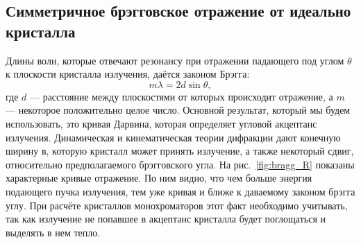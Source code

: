 \documentclass[14pt,a4paper]{extarticle}
\numberwithin{equation}{section}
\begin{document}
\subsection{Симметричное брэгговское отражение от идеально кристалла}
Длины волн, которые отвечают резонансу при отражении падающего под углом $\theta$ к плоскости кристалла излучения, даётся законом Брэгга:  
\begin{equation}
	m\lambda = 2d\sin\theta,
\end{equation}
где $d$ --- расстояние между плоскостями от которых происходит отражение, а $m$ --- некоторое положительно целое число. Основной результат, который мы будем использовать, это кривая Дарвина, которая определяет угловой акцептанс излучения. Динамическая и кинематическая теории дифракции дают конечную ширину в, которую кристалл может принять излучение, а также некоторый сдвиг, относительно предполагаемого брэгговского угла. На рис.~\ref{fig:bragg_R} показаны характерные кривые отражение. По ним видно, что чем больше энергия подающего пучка излучения, тем уже кривая и ближе к даваемому законом брэгга углу. При расчёте кристаллов монохроматоров этот факт необходимо учитывать, так как излучение не попавшее в акцептанс кристалла будет поглощаться и выделять в нем тепло. 
\end{document}
